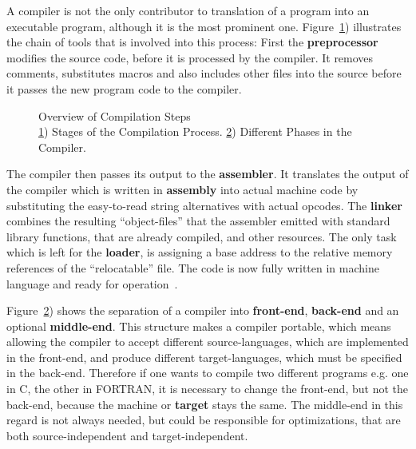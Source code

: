 {A compiler is not the only contributor to translation of a program into an executable program, although it is the most prominent one.
Figure~\ref{fig:cmpstruct}) illustrates the chain of tools that is involved into this process:
First the \textbf{preprocessor} modifies the source code, before it is processed by the compiler.
It removes comments, substitutes macros and also includes other files into the source before it passes the new program code to the compiler.

\begin{figure}[htb]
    \centering
    \begin{subfigure}[t]{0.25\textwidth}
        
        \caption{\label{fig:cmpstruct} }
    \end{subfigure} \hspace{2cm}
    \begin{subfigure}[t]{0.37\textwidth}
        
        \caption{\label{fig:cmpintstruct} }
    \end{subfigure}
    \caption{\label{fig:cmp}Overview of Compilation Steps \\ \ref{fig:cmpstruct}) Stages of the Compilation Process. \ref{fig:cmpintstruct}) Different Phases in the Compiler.}
\end{figure}

The compiler then passes its output to the \textbf{assembler}.
It translates the output of the compiler which is written in \textbf{assembly} into actual machine code by substituting the easy-to-read string alternatives with actual opcodes.
The \textbf{linker} combines the resulting ``object-files'' that the assembler emitted with standard library functions, that are already compiled, and other resources. 
The only task which is left for the \textbf{loader}, is assigning a base address to the relative memory references of the ``relocatable'' file.
The code is now fully written in machine language and ready for operation~\cite{UBHD-66483012}.

Figure~\ref{fig:cmpintstruct}) shows the separation of a compiler into \textbf{front-end}, \textbf{back-end} and an optional \textbf{middle-end}.
This structure makes a compiler portable, which means allowing the compiler to accept different source-languages, which are implemented in the front-end, and produce different target-languages, which must be specified in the back-end.
Therefore if one wants to compile two different programs e.g. one in C, the other in FORTRAN, it is necessary to change the front-end, but not the back-end, because the machine or \textbf{target} stays the same.
The middle-end in this regard is not always needed, but could be responsible for optimizations, that are both source-independent and target-independent.

}

